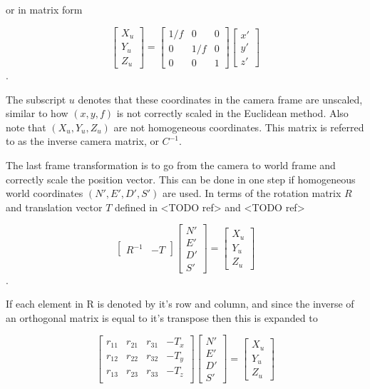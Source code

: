   or in matrix form
  
   \[
   \begin{bmatrix} X_u \\ Y_u \\ Z_u \end{bmatrix}
   =
   \begin{bmatrix} 
       1/f &   0   &  0 \\ 
       0   &  1/f  &  0 \\
       0   &   0   &  1  
   \end{bmatrix}
   \begin{bmatrix} x' \\ y' \\ z' \end{bmatrix}
   \].
   
  The subscript $u$ denotes that these coordinates in the camera frame are unscaled, similar to how $(x,y,f)$ is not correctly scaled in the Euclidean method.  Also note that $(X_u, Y_u, Z_u)$ are not homogeneous coordinates.  This matrix is referred to as the inverse camera matrix, or $C^{-1}$.
  
  The last frame transformation is to go from the camera to world frame and correctly scale the position vector.  This can be done in one step if homogeneous world coordinates $(N',E',D',S')$ are used.  In terms of the rotation matrix $R$ and translation vector $T$ defined in <TODO ref> and <TODO ref>  
  
     \[
     \begin{bmatrix} R^{-1} & -T \end{bmatrix}
     \begin{bmatrix} N' \\ E' \\ D' \\ S' \end{bmatrix}
     =
     \begin{bmatrix} X_u \\ Y_u \\ Z_u \end{bmatrix}
     \].
     
 If each element in R is denoted by it's row and column, and since the inverse of an orthogonal matrix is equal to it's transpose then this is expanded to
 
      \[
      \begin{bmatrix} r_{11} & r_{21} & r_{31} & -T_x \\
                      r_{12} & r_{22} & r_{32} & -T_y \\
                      r_{13} & r_{23} & r_{33} & -T_z \\
      \end{bmatrix}
      \begin{bmatrix} N' \\ E' \\ D' \\ S' \end{bmatrix}
      =
      \begin{bmatrix} X_u \\ Y_u \\ Z_u \end{bmatrix}
      \]
      
